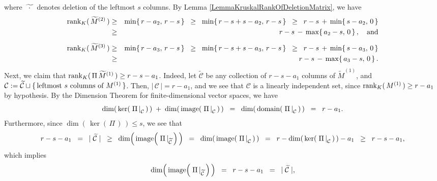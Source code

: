 where $\widetilde{{\color{white}\cdot}\cdot{\color{white}\cdot}}$ denotes deletion of the leftmost $s$ columns.
By Lemma \ref{LemmaKruskalRankOfDeletionMatrix}, we have
\begin{eqnarray*}
\rank_{K}(\,\widetilde{M}^{(2)}\,)
& \geq & \min\!\left\{\,r-a_{2},\,r-s\,\right\}
\;\;\geq\;\; \min\!\left\{\,r-s+s-a_{2},\,r-s\,\right\}
\;\;\geq\;\; r-s\,+\,\min\!\left\{\,s-a_{2},\,0\,\right\}
\\
&\geq& r-s\,-\,\max\!\left\{\,a_{2}-s,\,0\,\right\},
\quad\textnormal{and}
\\
\rank_{K}(\,\widetilde{M}^{(3)}\,)
& \overset{{\color{white}\vert}}{\geq} & \min\!\left\{\,r-a_{3},\,r-s\,\right\}
\;\;\geq\;\; \min\!\left\{\,r-s+s-a_{3},\,r-s\,\right\}
\;\;\geq\;\; r-s \,+\, \min\!\left\{\,s-a_{3},\,0\,\right\}
\\
&\geq& r-s\,-\,\max\!\left\{\,a_{3}-s,\,0\,\right\}.
\end{eqnarray*}
Next, we claim that $\textnormal{rank}_{K}(\,\Pi\,\widetilde{M}^{(1)}\,) \geq r - s - a_{1}$.
Indeed, let $\widetilde{\mathcal{C}}$ be any collection of $r - s - a_{1}$ columns of $\widetilde{M}^{(1)}$,
and $\mathcal{C} := \widetilde{\mathcal{C}} \sqcup \{\,\textnormal{leftmost $s$ columns of $M^{(1)}$}\,\}$.
Then, $\left\vert\,\mathcal{C}\,\right\vert = r - a_{1}$, and we see that $\mathcal{C}$ is a linearly independent
set, since $\textnormal{rank}_{K}(\,M^{(1)}\,) \geq r - a_{1}$ by hypothesis.
By the Dimension Theorem for finite-dimensional vector spaces, we have
\begin{equation*}
\dim\!\left(\,\ker\!\left(\,\left.\Pi\,\right\vert_{\mathcal{C}}\,\right)\,\right)
\; + \;
\dim\!\left(\,\textnormal{image}\!\left(\,\left.\Pi\,\right\vert_{\mathcal{C}}\,\right)\,\right)
\;\; = \;\;
\dim\!\left(\,\textnormal{domain}\!\left(\,\left.\Pi\,\right\vert_{\mathcal{C}}\,\right)\,\right)
\;\; = \;\; r - a_{1}.
\end{equation*}
Furthermore, since $\dim\!\left(\,\ker\!\left(\,\Pi\,\right)\,\right) \leq s$, we see that
\begin{equation*}
r - s - a_{1}
\;\; = \;\; \vert\;\widetilde{\mathcal{C}}\;\vert
\;\; \geq \;\; \dim\!\left(\,\textnormal{image}\!\left(\,\left.\Pi\,\right\vert_{\widetilde{\mathcal{C}}}\,\right)\,\right)
\;\; = \;\; \dim\!\left(\,\textnormal{image}\!\left(\,\left.\Pi\,\right\vert_{\mathcal{C}}\,\right)\,\right)
\;\; = \;\; r - \dim\!\left(\,\ker\!\left(\,\left.\Pi\,\right\vert_{\mathcal{C}}\,\right)\,\right) - a_{1}
\;\; \geq \;\; r - s - a_{1},
\end{equation*}
which implies
\begin{equation*}
\dim\!\left(\,\textnormal{image}\!\left(\,\left.\Pi\,\right\vert_{\widetilde{\mathcal{C}}}\,\right)\,\right)
\;\; = \;\; r - s - a_{1}
\;\; = \;\; \vert\;\widetilde{\mathcal{C}}\;\vert,
\end{equation*}
